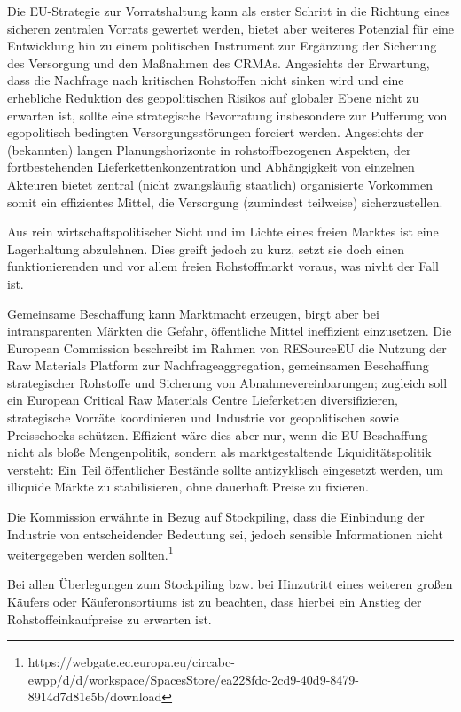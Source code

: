 \documentclass[12pt,a4paper,oneside]{book} %
\begin{document}
Die EU-Strategie zur Vorratshaltung kann als erster Schritt in die Richtung eines sicheren zentralen Vorrats gewertet werden, bietet aber weiteres Potenzial für eine Entwicklung hin zu einem politischen Instrument zur Ergänzung der Sicherung des Versorgung und den Maßnahmen des CRMAs. Angesichts der Erwartung, dass die Nachfrage nach kritischen Rohstoffen nicht sinken wird und eine erhebliche Reduktion des geopolitischen Risikos auf globaler Ebene nicht zu erwarten ist, sollte eine strategische Bevorratung insbesondere zur Pufferung von egopolitisch bedingten Versorgungsstörungen forciert werden. Angesichts der (bekannten) langen Planungshorizonte in rohstoffbezogenen Aspekten, der fortbestehenden Lieferkettenkonzentration und Abhängigkeit von einzelnen Akteuren bietet zentral (nicht zwangsläufig staatlich) organisierte Vorkommen somit ein effizientes Mittel, die Versorgung (zumindest teilweise) sicherzustellen.\autocite[Ähnlich]{MPRA Paper No. 125317}

Aus rein wirtschaftspolitischer Sicht und im Lichte eines freien Marktes ist eine Lagerhaltung abzulehnen.
Dies greift jedoch zu kurz, setzt sie doch einen funktionierenden und vor allem freien Rohstoffmarkt voraus, was nivht der Fall ist.

Gemeinsame Beschaffung kann Marktmacht erzeugen, birgt aber bei intransparenten Märkten die Gefahr, öffentliche Mittel ineffizient einzusetzen. Die European Commission beschreibt im Rahmen von RESourceEU die Nutzung der Raw Materials Platform zur Nachfrageaggregation, gemeinsamen Beschaffung strategischer Rohstoffe und Sicherung von Abnahmevereinbarungen; zugleich soll ein European Critical Raw Materials Centre Lieferketten diversifizieren, strategische Vorräte koordinieren und Industrie vor geopolitischen sowie Preisschocks schützen. Effizient wäre dies aber nur, wenn die EU Beschaffung nicht als bloße Mengenpolitik, sondern als marktgestaltende Liquiditätspolitik versteht: Ein Teil öffentlicher Bestände sollte antizyklisch eingesetzt werden, um illiquide Märkte zu stabilisieren, ohne dauerhaft Preise zu fixieren.

Die Kommission erwähnte in Bezug auf Stockpiling, dass die Einbindung der Industrie von entscheidender Bedeutung sei, jedoch sensible Informationen nicht weitergegeben werden sollten.\footnote{https://webgate.ec.europa.eu/circabc-ewpp/d/d/workspace/SpacesStore/ea228fdc-2cd9-40d9-8479-8914d7d81e5b/download}

Bei allen Überlegungen zum Stockpiling bzw. bei Hinzutritt eines weiteren großen Käufers oder Käuferonsortiums ist zu beachten, dass hierbei ein Anstieg der Rohstoffeinkaufpreise zu erwarten ist.
\end{document}
